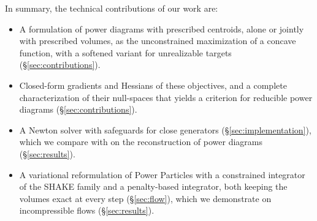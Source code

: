 \documentclass[main.tex]{subfiles}
\begin{document}
In summary, the technical contributions of our work are:
\begin{itemize}
  \item A formulation of power diagrams with prescribed centroids, alone or jointly with prescribed volumes, as the unconstrained maximization of a concave function, with a softened variant for unrealizable targets (\S\ref{sec:contributions}).
  \item Closed-form gradients and Hessians of these objectives, and a complete characterization of their null-spaces that yields a criterion for reducible power diagrams (\S\ref{sec:contributions}).
  \item A Newton solver with safeguards for close generators (\S\ref{sec:implementation}), which we compare with \citet{Bourne2025Inverting, Bourne2026ConvexOrder} on the reconstruction of power diagrams (\S\ref{sec:results}).
  \item A variational reformulation of Power Particles with a constrained integrator of the SHAKE family and a penalty-based integrator, both keeping the volumes exact at every step (\S\ref{sec:flow}), which we demonstrate on incompressible flows (\S\ref{sec:results}).
\end{itemize}
\end{document}
